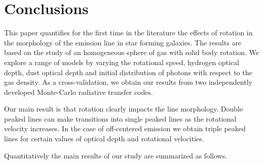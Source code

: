 \documentclass{emulateapj}
\newcommand{\ly}{{\ifmmode{{\rm Ly}\alpha~}\else{Ly$\alpha$~}\fi}}
\begin{document}
\section{Conclusions}
\label{sec:conclusions}

This paper quantifies for the first time in the literature the effects
of rotation in the morphology of the \ly emission line in star forming
galaxies.  The results are based on the study of an homogeneous sphere
of gas with solid body rotation. We explore a range of models by varying
the rotational speed, hydrogen optical depth, dust optical depth and
initial distribution of \ly photons with respect to the gas
density. As a cross-validation, we obtain our results from two
independently developed Monte-Carlo radiative transfer codes. 

Our main result is that rotation clearly impacts the \ly line
morphology. Double peaked lines can make transitions into single
peaked lines as the rotational velocity increases. In the case of
off-centered emission we obtain triple peaked lines for certain
values of optical depth and rotational velocities. 

Quantitatively the main results of our study are summarized as follows.
\end{document}
